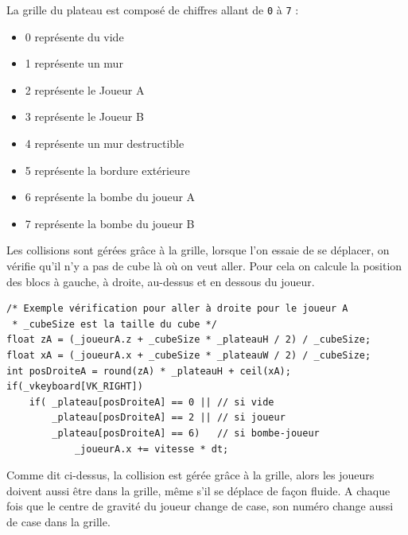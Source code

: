 \documentclass{article}
\begin{document}
    La grille du plateau est composé de chiffres allant de \texttt{0} à \texttt{7} :
    \begin{itemize}
        \item 0 représente du vide
        \item 1 représente un mur
        \item 2 représente le Joueur A
        \item 3 représente le Joueur B
        \item 4 représente un mur destructible
        \item 5 représente la bordure extérieure
        \item 6 représente la bombe du joueur A
        \item 7 représente la bombe du joueur B
    \end{itemize}
    \vspace{10pt}

    Les collisions sont gérées grâce à la grille, lorsque l'on essaie de se déplacer, on vérifie qu'il n'y a pas de cube là où on veut aller. Pour cela on calcule la position des blocs à gauche, à droite, au-dessus et en dessous du joueur.
    \begin{center}\begin{minipage}{0.9\textwidth}
        \begin{verbatim}
/* Exemple vérification pour aller à droite pour le joueur A
 * _cubeSize est la taille du cube */
float zA = (_joueurA.z + _cubeSize * _plateauH / 2) / _cubeSize;
float xA = (_joueurA.x + _cubeSize * _plateauW / 2) / _cubeSize;
int posDroiteA = round(zA) * _plateauH + ceil(xA);
if(_vkeyboard[VK_RIGHT])
    if( _plateau[posDroiteA] == 0 || // si vide
        _plateau[posDroiteA] == 2 || // si joueur
        _plateau[posDroiteA] == 6)   // si bombe-joueur
            _joueurA.x += vitesse * dt;
        \end{verbatim}
    \end{minipage}\end{center}
    \vspace{10pt}

    Comme dit ci-dessus, la collision est gérée grâce à la grille, alors les joueurs doivent aussi être dans la grille, même s'il se déplace de façon fluide. A chaque fois que le centre de gravité du joueur change de case, son numéro change aussi de case dans la grille.
    \vspace{10pt}
\end{document}
